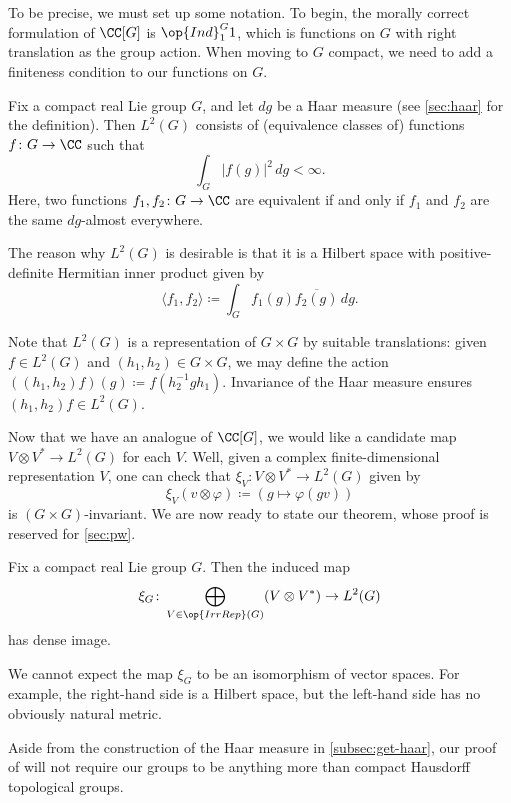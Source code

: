 \documentclass{amsart}
\begin{document}
To be precise, we must set up some notation. To begin, the morally correct formulation of $\CC[G]$ is $\op{Ind}_1^G1$, which is functions on $G$ with right translation as the group action. When moving to $G$ compact, we need to add a finiteness condition to our functions on $G$.
\begin{definition}
	Fix a compact real Lie group $G$, and let $dg$ be a Haar measure (see \cref{sec:haar} for the definition). Then $L^2(G)$ consists of (equivalence classes of) functions $f\colon G\to\CC$ such that
	\[\int_G\left|f(g)\right|^2\,dg<\infty.\]
	Here, two functions $f_1,f_2\colon G\to\CC$ are equivalent if and only if $f_1$ and $f_2$ are the same $dg$-almost everywhere.
\end{definition}
\begin{remark}
	The reason why $L^2(G)$ is desirable is that it is a Hilbert space with positive-definite Hermitian inner product given by
	\[\langle f_1,f_2\rangle\coloneqq\int_Gf_1(g)\overline{f_2(g)}\,dg.\]
\end{remark}
\begin{remark} \label{rem:g-g-action-on-l2}
	Note that $L^2(G)$ is a representation of $G\times G$ by suitable translations: given $f\in L^2(G)$ and $(h_1,h_2)\in G\times G$, we may define the action $((h_1,h_2)f)(g)\coloneqq f\left(h_2^{-1}gh_1\right)$. Invariance of the Haar measure ensures $(h_1,h_2)f\in L^2(G)$.
\end{remark}
Now that we have an analogue of $\CC[G]$, we would like a candidate map $V\otimes V^*\to L^2(G)$ for each $V$. Well, given a complex finite-dimensional representation $V$, one can check that $\xi_V\colon V\otimes V^*\to L^2(G)$ given by
\[\xi_V(v\otimes\varphi)\coloneqq(g\mapsto\varphi(gv))\]
is $(G\times G)$-invariant.
We are now ready to state our theorem, whose proof is reserved for \cref{sec:pw}.
\begin{theorem} \label{thm:pw}
	Fix a compact real Lie group $G$. Then the induced map
	\[\xi_G\colon\bigoplus_{V\in\op{IrrRep}(G)}(V\otimes V^*)\to L^2(G)\]
	has dense image.
\end{theorem}
\begin{remark}
	We cannot expect the map $\xi_G$ to be an isomorphism of vector spaces. For example, the right-hand side is a Hilbert space, but the left-hand side has no obviously natural metric.
\end{remark}
\begin{remark}
	Aside from the construction of the Haar measure in \cref{subsec:get-haar}, our proof of  will not require our groups to be anything more than compact Hausdorff topological groups.
\end{remark}
\end{document}
